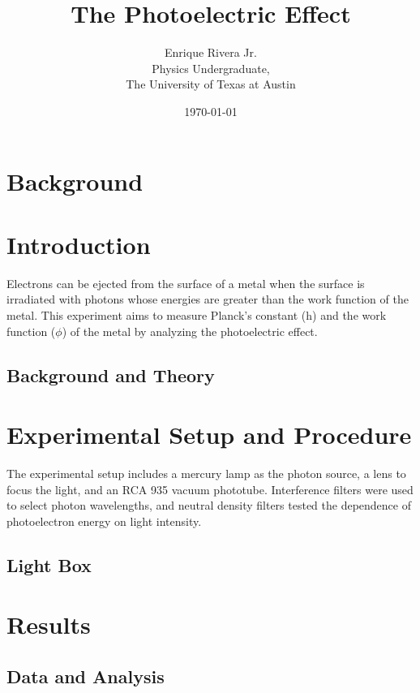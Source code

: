 \documentclass[12pt]{article}
\title{The Photoelectric Effect}
\author{Enrique Rivera Jr. \\
                Physics Undergraduate, \\ 
                The University of Texas at Austin}
\date{\today}
\begin{document}
\maketitle

\begin{abstract}

\end{abstract}

\section{Background}

\section{Introduction}
        Electrons can be ejected from the surface of a metal when the surface is irradiated with photons whose energies are greater than the work function of the metal. This experiment aims to measure Planck's constant (h) and the work function ($\phi$) of the metal by analyzing the photoelectric effect.

        \subsection{Background and Theory}



\section{Experimental Setup and Procedure}
        The experimental setup includes a mercury lamp as the photon source, a lens to focus the light, and an RCA 935 vacuum phototube. Interference filters were used to select photon wavelengths, and neutral density filters tested the dependence of photoelectron energy on light intensity.

        \subsection{Light Box}
                

\section{Results}
        \subsection{Data and Analysis}
\end{document}
